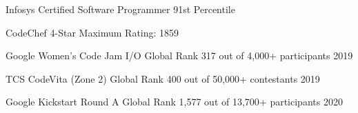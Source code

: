 
\begin{cvhonors}
  \cvhonor
    {Infosys Certified Software Programmer}
    {91st Percentile}
    {}
    {}

  \cvhonor
    {CodeChef 4-Star}
    {Maximum Rating: 1859}
    {}
    {}

  \cvhonor
    {Google Women's Code Jam I/O}
    {Global Rank 317 out of 4,000+ participants}
    {}
    {2019}

  \cvhonor
    {TCS CodeVita (Zone 2)}
    {Global Rank 400 out of 50,000+ contestants}
    {}
    {2019}

  \cvhonor
    {Google Kickstart Round A}
    {Global Rank 1,577 out of 13,700+ participants}
    {}
    {2020}
\end{cvhonors}
